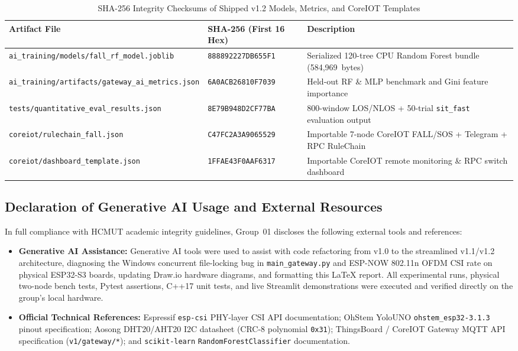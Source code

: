 \documentclass{hcmut-report}
\begin{document}
\begin{table}[H]
\centering
\caption{SHA-256 Integrity Checksums of Shipped v1.2 Models, Metrics, and CoreIOT Templates}
\label{tab:checksums}
\footnotesize
\begin{tabularx}{\textwidth}{|P{5.0cm}|C{3.8cm}|Y|}
\hline
\textbf{Artifact File} & \textbf{SHA-256 (First 16 Hex)} & \textbf{Description} \\
\hline
\texttt{ai\_training/\allowbreak models/\allowbreak fall\_rf\_model.joblib} & \texttt{888892227DB655F1} & Serialized 120-tree CPU Random Forest bundle (584,969~bytes) \\
\hline
\texttt{ai\_training/\allowbreak artifacts/\allowbreak gateway\_ai\_metrics.json} & \texttt{6A0ACB26810F7039} & Held-out RF \& MLP benchmark and Gini feature importance \\
\hline
\texttt{tests/\allowbreak quantitative\_\allowbreak eval\_\allowbreak results.json} & \texttt{8E79B948D2CF77BA} & 800-window LOS/NLOS + 50-trial \texttt{sit\_fast} evaluation output \\
\hline
\texttt{coreiot/\allowbreak rulechain\_fall.json} & \texttt{C47FC2A3A9065529} & Importable 7-node CoreIOT FALL/SOS + Telegram + RPC RuleChain \\
\hline
\texttt{coreiot/\allowbreak dashboard\_template.json} & \texttt{1FFAE43F0AAF6317} & Importable CoreIOT remote monitoring \& RPC switch dashboard \\
\hline
\end{tabularx}
\end{table}

\subsection{Declaration of Generative AI Usage and External Resources}
In full compliance with HCMUT academic integrity guidelines, Group~01 discloses the following external tools and references:
\begin{itemize}
  \item \textbf{Generative AI Assistance:} Generative AI tools were used to assist with code refactoring from v1.0 to the streamlined v1.1/v1.2 architecture, diagnosing the Windows concurrent file-locking bug in \texttt{main\_gateway.py} and ESP-NOW 802.11n OFDM CSI rate on physical ESP32-S3 boards, updating Draw.io hardware diagrams, and formatting this LaTeX report. All experimental runs, physical two-node bench tests, Pytest assertions, C++17 unit tests, and live Streamlit demonstrations were executed and verified directly on the group's local hardware.
  \item \textbf{Official Technical References:} Espressif \texttt{esp-csi} PHY-layer CSI API documentation; OhStem YoloUNO \texttt{ohstem\_esp32-3.1.3} pinout specification; Aosong DHT20/AHT20 I2C datasheet (CRC-8 polynomial \texttt{0x31}); ThingsBoard / CoreIOT Gateway MQTT API specification (\texttt{v1/gateway/*}); and \texttt{scikit-learn} \texttt{RandomForestClassifier} documentation.
\end{itemize}
\end{document}
